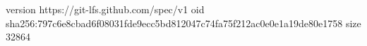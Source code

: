 version https://git-lfs.github.com/spec/v1
oid sha256:797c6e8cbad6f08031fde9ecc5bd812047c74fa75f212ac0e0e1a19de80e1758
size 32864
